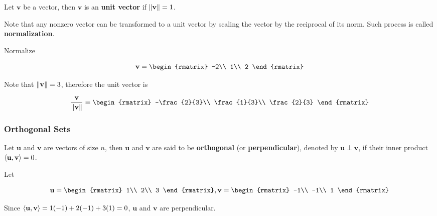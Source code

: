 \documentclass[a4paper,12pt]{article}
\begin{document}
\begin{dft}
  Let $\mathbf{v}$ be a vector, then $\mathbf{v}$ is an \textbf{unit vector} if $\left\| \mathbf{v}\right\|=1$.
\end{dft}\n

Note that any nonzero vector can be transformed to a unit vector by scaling the vector by the reciprocal of its norm. Such process is called \textbf{normalization}.\n

\begin{exm}
  Normalize

  $$\mathbf{v}=\begin{rmatrix}
    -2\\
    1\\
    2
  \end{rmatrix}$$\s

  \ans Note that $\left\| \mathbf{v}\right\|=3$, therefore the unit vector is

  $$\frac{\mathbf{v}}{\nrm{\mathbf{v}}}=\begin{rmatrix}
    -\frac{2}{3}\\
    \frac{1}{3}\\
    \frac{2}{3}
  \end{rmatrix}$$
\end{exm}

\subsubsection{Orthogonal Sets}
\begin{dft}
  Let $\mathbf{u}$ and $\mathbf{v}$ are vectors of size $n$, then $\mathbf{u}$ and $\mathbf{v}$ are said to be \textbf{orthogonal} (or \textbf{perpendicular}), denoted by $\mathbf{u}\perp\mathbf{v}$, if their inner product $\left\langle \mathbf{u},\mathbf{v}\right\rangle=0$.
\end{dft}\n

\begin{exm}
  Let

  $$\mathbf{u}=\begin{rmatrix}
    1\\
    2\\
    3
  \end{rmatrix},\mathbf{v}=\begin{rmatrix}
    -1\\
    -1\\
    1
  \end{rmatrix}$$\s

  Since $\left\langle \mathbf{u},\mathbf{v}\right\rangle=1(-1)+2(-1)+3(1)=0$, $\mathbf{u}$ and $\mathbf{v}$ are perpendicular.
\end{exm}\n
\end{document}

